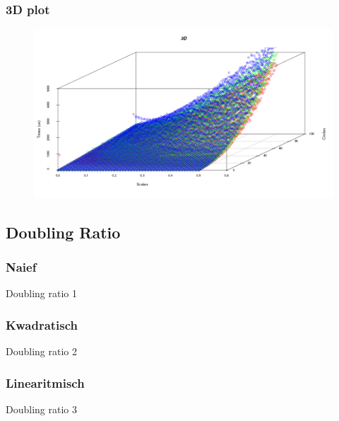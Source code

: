 \subsubsection{3D plot}
\begin{figure}[H]
   \centering
   \includegraphics[width=\textwidth]{illustraties/3DScatter.png}
\end{figure}

\subsection{Doubling Ratio}
\subsubsection{Naief}
\begin{table}[H]

\label{doublingratio_1}
\caption{Doubling ratio 1}
\end{table}

\subsubsection{Kwadratisch}
\begin{table}[H]

\label{doublingratio_2}
\caption{Doubling ratio 2}
\end{table}

\subsubsection{Linearitmisch}
\begin{table}[h]

\label{doublingratio_3}
\caption{Doubling ratio 3}
\end{table}
